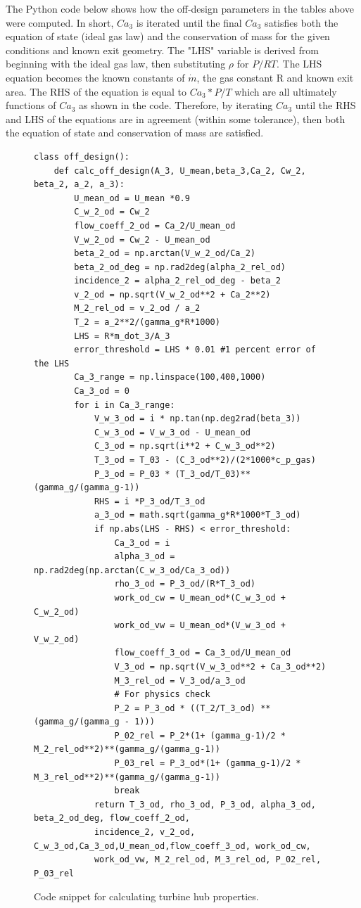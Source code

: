 \documentclass[12pt, letter]{report}
\begin{document}
The Python code below shows how the off-design parameters in the tables above were computed. In short, $Ca_3$ is iterated until the final $Ca_3$ satisfies both the equation of state (ideal gas law) and the conservation of mass for the given conditions and known exit geometry. The "LHS" variable is derived from beginning with the ideal gas law, then substituting $\rho$ for $P/{RT}$. The LHS equation becomes the known constants of $\dot{m}$, the gas constant R and known exit area. The RHS of the equation is equal to $Ca_3 * P/{T}$ which are all ultimately functions of $Ca_3$ as shown in the code. Therefore, by iterating $Ca_3$ until the RHS and LHS of the equations are in agreement (within some tolerance), then both the equation of state and conservation of mass are satisfied.
\clearpage
\begin{figure}[H]
    \begin{verbatim}
class off_design():   
    def calc_off_design(A_3, U_mean,beta_3,Ca_2, Cw_2, beta_2, a_2, a_3):
        U_mean_od = U_mean *0.9
        C_w_2_od = Cw_2
        flow_coeff_2_od = Ca_2/U_mean_od
        V_w_2_od = Cw_2 - U_mean_od
        beta_2_od = np.arctan(V_w_2_od/Ca_2)
        beta_2_od_deg = np.rad2deg(alpha_2_rel_od)
        incidence_2 = alpha_2_rel_od_deg - beta_2 
        v_2_od = np.sqrt(V_w_2_od**2 + Ca_2**2) 
        M_2_rel_od = v_2_od / a_2 
        T_2 = a_2**2/(gamma_g*R*1000)
        LHS = R*m_dot_3/A_3
        error_threshold = LHS * 0.01 #1 percent error of the LHS
        Ca_3_range = np.linspace(100,400,1000)
        Ca_3_od = 0
        for i in Ca_3_range:
            V_w_3_od = i * np.tan(np.deg2rad(beta_3))
            C_w_3_od = V_w_3_od - U_mean_od
            C_3_od = np.sqrt(i**2 + C_w_3_od**2)
            T_3_od = T_03 - (C_3_od**2)/(2*1000*c_p_gas)
            P_3_od = P_03 * (T_3_od/T_03)**(gamma_g/(gamma_g-1))
            RHS = i *P_3_od/T_3_od
            a_3_od = math.sqrt(gamma_g*R*1000*T_3_od)
            if np.abs(LHS - RHS) < error_threshold:
                Ca_3_od = i
                alpha_3_od = np.rad2deg(np.arctan(C_w_3_od/Ca_3_od))
                rho_3_od = P_3_od/(R*T_3_od)
                work_od_cw = U_mean_od*(C_w_3_od + C_w_2_od)
                work_od_vw = U_mean_od*(V_w_3_od + V_w_2_od)
                flow_coeff_3_od = Ca_3_od/U_mean_od
                V_3_od = np.sqrt(V_w_3_od**2 + Ca_3_od**2)
                M_3_rel_od = V_3_od/a_3_od
                # For physics check
                P_2 = P_3_od * ((T_2/T_3_od) ** (gamma_g/(gamma_g - 1)))
                P_02_rel = P_2*(1+ (gamma_g-1)/2 * M_2_rel_od**2)**(gamma_g/(gamma_g-1))
                P_03_rel = P_3_od*(1+ (gamma_g-1)/2 * M_3_rel_od**2)**(gamma_g/(gamma_g-1))
                break
            return T_3_od, rho_3_od, P_3_od, alpha_3_od, beta_2_od_deg, flow_coeff_2_od, 
            incidence_2, v_2_od, C_w_3_od,Ca_3_od,U_mean_od,flow_coeff_3_od, work_od_cw,
            work_od_vw, M_2_rel_od, M_3_rel_od, P_02_rel, P_03_rel
    \end{verbatim}
    \caption{Code snippet for calculating turbine hub properties.}
    \label{fig:code_turbine_hub}
\end{figure}
\end{document}
